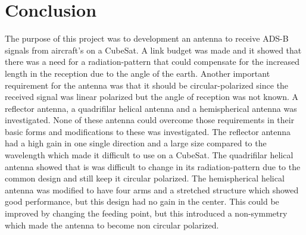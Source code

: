 \chapter{Conclusion}\label{ch:conclusion}
The purpose of this project was to development an antenna to receive ADS-B signals from aircraft's on a CubeSat. A link budget was made and it showed that there was a need for a radiation-pattern that could compensate for the increased length in the reception due to the angle of the earth. Another important requirement for the antenna was that it should be circular-polarized since the received signal was linear polarized but the angle of reception was not known. A reflector antenna, a quadrifilar helical antenna and a hemispherical antenna was investigated. None of these antenna could overcome those requirements in their basic forms and modifications to these was investigated. The reflector antenna had a high gain in one single direction and a large size compared to the wavelength which made it difficult to use on a CubeSat. The quadrifilar helical antenna showed that is was difficult to change in its radiation-pattern due to the common design and still keep it circular polarized. The hemispherical helical antenna was modified to have four arms and a stretched structure which showed good performance, but this design had no gain in the center. This could be improved by changing the feeding point, but this introduced a non-symmetry which made the antenna to become non circular polarized.       



